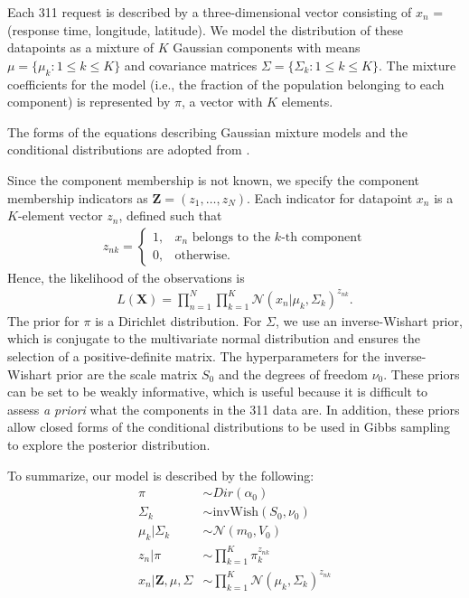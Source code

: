 \documentclass[twoside]{article}
\newcommand{\N}{\mathcal{N}}
\theoremstyle{theorem}
\theoremstyle{theorem}
\theoremstyle{theorem}
\theoremstyle{lemma}
\theoremstyle{definition}
\theoremstyle{example}
\begin{document}
Each 311 request is described by a three-dimensional vector consisting of $x_n$ = (response time, longitude, latitude). We model the distribution of these datapoints as a mixture of $K$ Gaussian components with means $\mu = \{\mu_k :  1\leq k\leq K\}$ and covariance matrices $\Sigma = \{\Sigma_k :  1\leq k\leq K\}$. The mixture coefficients for the model (i.e., the fraction of the population belonging to each component) is represented by $\pi$, a vector with $K$ elements.  

The forms of the equations describing Gaussian mixture models and the conditional distributions are adopted from \cite{Gelman, Jones}.

Since the component membership is not known, we specify the component membership indicators as $\mathbf{Z} = (z_1, \ldots, z_N)$. Each indicator for datapoint $x_n$ is a $K$-element vector $z_n$, defined such that \begin{align}
z_{nk} = \begin{cases}
1, & x_n\text{ belongs to the $k$-th component}\\
0, & \text{otherwise}. 
\end{cases}
\end{align}
Hence, the likelihood of the observations is 
\begin{align}
L(\mathbf{X}) = \prod_{n=1}^N\prod_{k=1}^K \N(x_n| \mu_k, \Sigma_k)^{z_{nk}}.
\end{align}
The prior for $\pi$ is a Dirichlet distribution. For $\Sigma$, we use an inverse-Wishart prior, which is conjugate to the multivariate normal distribution and ensures the selection of a positive-definite matrix. The hyperparameters for the inverse-Wishart prior are the scale matrix $S_0$ and the degrees of freedom $\nu_0$.  These priors can be set to be weakly informative, which is useful because it is difficult to assess \textit{a priori} what the components in the 311 data are. In addition, these priors allow closed forms of the conditional distributions to be used in Gibbs sampling to explore the posterior distribution. 

To summarize, our model is described by the following: 
\begin{align}
\pi &\sim Dir(\alpha_0)\\
\Sigma_k &\sim \mathrm{invWish}(S_0, \nu_0)\\
\mu_k | \Sigma_k &\sim \N(m_0, V_0)\\
z_n | \pi &\sim \prod_{k=1}^K \pi_k^{z_{nk}}\\
x_n | \mathbf{Z}, \mu, \Sigma &\sim \prod_{k=1}^K \N(\mu_k, \Sigma_k)^{z_{nk}}
\end{align}
\end{document}
